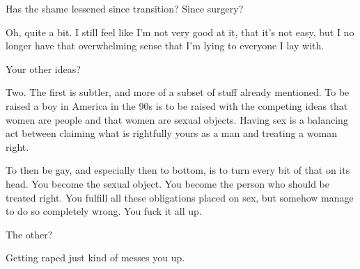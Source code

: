 \begin{ally}
Has the shame lessened since transition? Since surgery?
\end{ally}
Oh, quite a bit. I still feel like I'm not very good at it, that it's not easy, but I no longer have that overwhelming sense that I'm lying to everyone I lay with.

\begin{ally}
Your other ideas?
\end{ally}
Two. The first is subtler, and more of a subset of stuff already mentioned. To be raised a boy in America in the 90s is to be raised with the competing ideas that women are people and that women are sexual objects. Having sex is a balancing act between claiming what is rightfully yours as a man and treating a woman right.

To then be gay, and especially then to bottom, is to turn every bit of that on its head. You become the sexual object. You become the person who should be treated right. You fulfill all these obligations placed on sex, but somehow manage to do so completely wrong. You fuck it all up.

\begin{ally}
The other?
\end{ally}
Getting raped just kind of messes you up.

